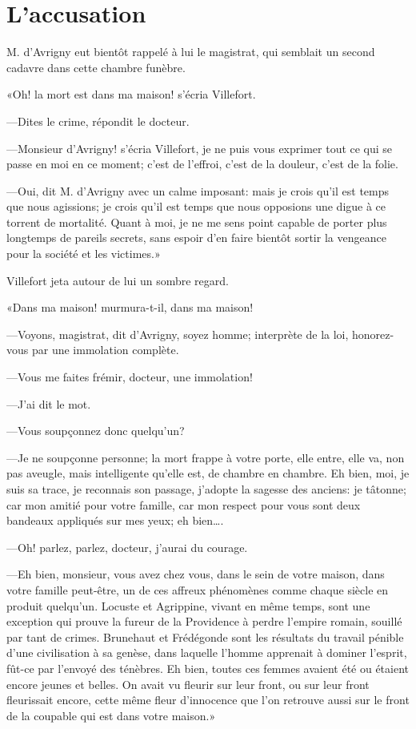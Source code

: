 \chapter{L'accusation}

\lettrine{M}{.} d'Avrigny eut bientôt rappelé à lui le magistrat, qui semblait un second cadavre dans cette chambre funèbre. 

\zz
«Oh! la mort est dans ma maison! s'écria Villefort. 

\zz
—Dites le crime, répondit le docteur. 

—Monsieur d'Avrigny! s'écria Villefort, je ne puis vous exprimer tout ce qui se passe en moi en ce moment; c'est de l'effroi, c'est de la douleur, c'est de la folie. 

—Oui, dit M. d'Avrigny avec un calme imposant: mais je crois qu'il est temps que nous agissions; je crois qu'il est temps que nous opposions une digue à ce torrent de mortalité. Quant à moi, je ne me sens point capable de porter plus longtemps de pareils secrets, sans espoir d'en faire bientôt sortir la vengeance pour la société et les victimes.» 

Villefort jeta autour de lui un sombre regard. 

«Dans ma maison! murmura-t-il, dans ma maison! 

—Voyons, magistrat, dit d'Avrigny, soyez homme; interprète de la loi, honorez-vous par une immolation complète. 

—Vous me faites frémir, docteur, une immolation! 

—J'ai dit le mot. 

—Vous soupçonnez donc quelqu'un? 

—Je ne soupçonne personne; la mort frappe à votre porte, elle entre, elle va, non pas aveugle, mais intelligente qu'elle est, de chambre en chambre. Eh bien, moi, je suis sa trace, je reconnais son passage, j'adopte la sagesse des anciens: je tâtonne; car mon amitié pour votre famille, car mon respect pour vous sont deux bandeaux appliqués sur mes yeux; eh bien\dots. 

—Oh! parlez, parlez, docteur, j'aurai du courage. 

—Eh bien, monsieur, vous avez chez vous, dans le sein de votre maison, dans votre famille peut-être, un de ces affreux phénomènes comme chaque siècle en produit quelqu'un. Locuste et Agrippine, vivant en même temps, sont une exception qui prouve la fureur de la Providence à perdre l'empire romain, souillé par tant de crimes. Brunehaut et Frédégonde sont les résultats du travail pénible d'une civilisation à sa genèse, dans laquelle l'homme apprenait à dominer l'esprit, fût-ce par l'envoyé des ténèbres. Eh bien, toutes ces femmes avaient été ou étaient encore jeunes et belles. On avait vu fleurir sur leur front, ou sur leur front fleurissait encore, cette même fleur d'innocence que l'on retrouve aussi sur le front de la coupable qui est dans votre maison.» 

